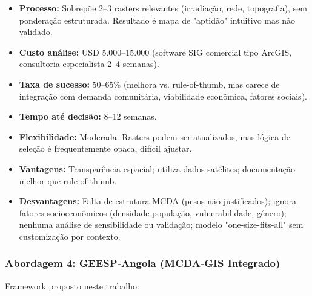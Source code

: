 \documentclass[12pt, a4paper]{article}
\begin{document}
\begin{itemize}
\item \textbf{Processo:} Sobrepõe 2--3 rasters relevantes (irradiação, rede, topografia), sem ponderação estruturada. Resultado é mapa de "aptidão" intuitivo mas não validado.

\item \textbf{Custo análise:} USD 5.000--15.000 (software SIG comercial tipo ArcGIS, consultoria especialista 2--4 semanas).

\item \textbf{Taxa de sucesso:} 50--65\% (melhora vs. rule-of-thumb, mas carece de integração com demanda comunitária, viabilidade econômica, fatores sociais).

\item \textbf{Tempo até decisão:} 8--12 semanas.

\item \textbf{Flexibilidade:} Moderada. Rasters podem ser atualizados, mas lógica de seleção é frequentemente opaca, difícil ajustar.

\item \textbf{Vantagens:} Transparência espacial; utiliza dados satélites; documentação melhor que rule-of-thumb.

\item \textbf{Desvantagens:} Falta de estrutura MCDA (pesos não justificados); ignora fatores socioeconômicos (densidade população, vulnerabilidade, género); nenhuma análise de sensibilidade ou validação; modelo "one-size-fits-all" sem customização por contexto.
\end{itemize}

\subsubsection{Abordagem 4: GEESP-Angola (MCDA-GIS Integrado)}

Framework proposto neste trabalho:
\end{document}
